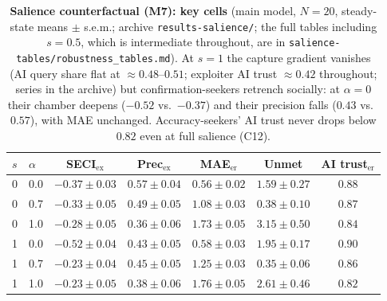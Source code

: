 \documentclass[11pt]{article}
\begin{document}
\begin{table}[h!]
\centering
\caption{\textbf{Salience counterfactual (M7): key cells} (main model,
$N = 20$, steady-state means $\pm$ s.e.m.; archive
\texttt{results-salience/}; the full tables including $s = 0.5$,
which is intermediate throughout, are in
\texttt{salience-tables/robustness\_tables.md}). At $s = 1$ the capture
gradient vanishes (AI query share flat at $\approx 0.48$--$0.51$;
exploiter AI trust $\approx 0.42$ throughout; series in the archive) but
confirmation-seekers retrench socially: at $\alpha = 0$ their chamber
deepens ($-0.52$ vs.\ $-0.37$) and their precision falls ($0.43$ vs.\
$0.57$), with MAE unchanged. Accuracy-seekers' AI trust never drops
below $0.82$ even at full salience (C12).}\label{tab:s8-salience}
\small
\begin{tabular}{@{}llccccc@{}}
\toprule
$s$ & $\alpha$ & SECI$_{\mathrm{ex}}$ & Prec$_{\mathrm{ex}}$ & MAE$_{\mathrm{er}}$ & Unmet & AI trust$_{\mathrm{er}}$ \\
\midrule
0 & 0.0 & $-0.37 \pm 0.03$ & $0.57 \pm 0.04$ & $0.56 \pm 0.02$ & $1.59 \pm 0.27$ & $0.88$ \\
0 & 0.7 & $-0.33 \pm 0.05$ & $0.49 \pm 0.05$ & $1.08 \pm 0.03$ & $0.38 \pm 0.10$ & $0.87$ \\
0 & 1.0 & $-0.28 \pm 0.05$ & $0.36 \pm 0.06$ & $1.73 \pm 0.05$ & $3.15 \pm 0.50$ & $0.84$ \\
\midrule
1 & 0.0 & $-0.52 \pm 0.04$ & $0.43 \pm 0.05$ & $0.58 \pm 0.03$ & $1.95 \pm 0.17$ & $0.90$ \\
1 & 0.7 & $-0.23 \pm 0.04$ & $0.45 \pm 0.05$ & $1.25 \pm 0.03$ & $0.35 \pm 0.06$ & $0.86$ \\
1 & 1.0 & $-0.23 \pm 0.05$ & $0.38 \pm 0.06$ & $1.76 \pm 0.05$ & $2.61 \pm 0.46$ & $0.82$ \\
\bottomrule
\end{tabular}
\end{table}
\end{document}
